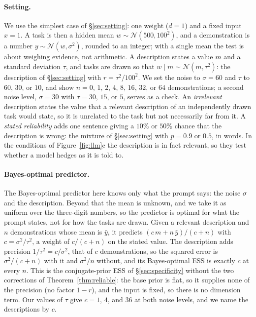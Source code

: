 \documentclass{article}
\begin{document}
\paragraph{Setting.} We use the simplest case of \S\ref{sec:setting}: one weight ($d = 1$) and a fixed input $x = 1$. A task is then a hidden mean $w \sim \mathcal{N}(500, 100^2)$, and a demonstration is a number $y \sim \mathcal{N}(w, \sigma^2)$, rounded to an integer; with a single mean the test is about weighing evidence, not arithmetic. A description states a value $m$ and a standard deviation $\tau$, and tasks are drawn so that $w \mid m \sim \mathcal{N}(m, \tau^2)$: the description of \S\ref{sec:setting} with $r = \tau^2/100^2$. We set the noise to $\sigma = 60$ and $\tau$ to $60$, $30$, or $10$, and show $n = 0$, $1$, $2$, $4$, $8$, $16$, $32$, or $64$ demonstrations; a second noise level, $\sigma = 30$ with $\tau = 30$, $15$, or $5$, serves as a check. An \emph{irrelevant} description states the value that a relevant description of an independently drawn task would state, so it is unrelated to the task but not necessarily far from it. A \emph{stated reliability} adds one sentence giving a $10\%$ or $50\%$ chance that the description is wrong: the mixture of \S\ref{sec:setting} with $p = 0.9$ or $0.5$, in words. In the conditions of Figure~\ref{fig:llm}c the description is in fact relevant, so they test whether a model hedges as it is told to.

\paragraph{Bayes-optimal predictor.} The Bayes-optimal predictor here knows only what the prompt says: the noise $\sigma$ and the description. Beyond that the mean is unknown, and we take it as uniform over the three-digit numbers, so the predictor is optimal for what the prompt states, not for how the tasks are drawn. Given a relevant description and $n$ demonstrations whose mean is $\bar y$, it predicts $(c\,m + n\,\bar y)/(c + n)$ with $c = \sigma^2/\tau^2$, a weight of $c/(c+n)$ on the stated value. The description adds precision $1/\tau^2 = c/\sigma^2$, that of $c$ demonstrations, so the squared error is $\sigma^2/(c+n)$ with it and $\sigma^2/n$ without, and its Bayes-optimal ESS is exactly $c$ at every $n$. This is the conjugate-prior ESS of \S\ref{sec:specificity} without the two corrections of Theorem~\ref{thm:reliable}: the base prior is flat, so it supplies none of the precision (no factor $1-r$), and the input is fixed, so there is no dimension term. Our values of $\tau$ give $c = 1$, $4$, and $36$ at both noise levels, and we name the descriptions by $c$.
\end{document}
